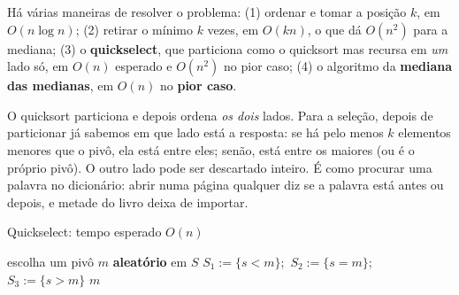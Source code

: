 Há várias maneiras de resolver o problema: (1) ordenar e tomar a posição $k$, em $O(n\log n)$; (2) retirar o mínimo $k$ vezes, em $O(kn)$, o que dá $O(n^2)$ para a mediana; (3) o \textbf{quickselect}, que particiona como o quicksort mas recursa em \emph{um} lado só, em $O(n)$ esperado e $O(n^2)$ no pior caso; (4) o algoritmo da \textbf{mediana das medianas}, em $O(n)$ no \textbf{pior caso}.

\begin{intuicao}
O quicksort particiona e depois ordena \emph{os dois} lados. Para a seleção, depois de particionar já sabemos em que lado está a resposta: se há pelo menos $k$ elementos menores que o pivô, ela está entre eles; senão, está entre os maiores (ou é o próprio pivô). O outro lado pode ser descartado inteiro. É como procurar uma palavra no dicionário: abrir numa página qualquer diz se a palavra está antes ou depois, e metade do livro deixa de importar.
\end{intuicao}

\begin{pseudo}{Quickselect: tempo esperado $O(n)$}
\begin{algorithmic}
  \State escolha um pivô $m$ \textbf{aleatório} em $S$
  \State $S_1:=\{s<m\}$;\ $S_2:=\{s=m\}$;\ $S_3:=\{s>m\}$
   \State \Return {}
   \State \Return $m$
  \Else \State \Return {}
  \EndIf
\EndFunction
\end{algorithmic}
\end{pseudo}

